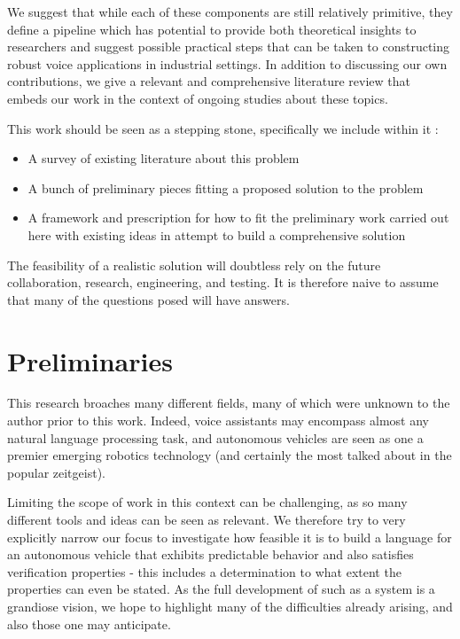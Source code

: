 \documentclass{article}
\begin{document}

We suggest that while each of these components are still relatively primitive,
they define a pipeline which has potential to provide both theoretical insights
to researchers and suggest possible practical steps that can be taken to
constructing robust voice applications in industrial settings. In addition to
discussing our own contributions, we give a relevant and comprehensive literature
review that embeds our work in the context of ongoing studies about these
topics.

This work should be seen as a stepping stone, specifically we include within it :

\begin{itemize}[noitemsep]
\item A survey of existing literature about this problem
\item A bunch of preliminary pieces fitting a proposed solution to the problem
\item A framework and prescription for how to fit the preliminary work carried
 out here with existing ideas in attempt to build a comprehensive solution
\end{itemize}

The feasibility of a realistic solution will doubtless rely on the future
collaboration, research, engineering, and testing. It is therefore naive to
assume that many of the questions posed will have answers.

\section{Preliminaries}

This research broaches many different fields, many of which were
unknown to the author prior to this work. Indeed, voice assistants may
encompass almost any natural language processing task, and autonomous vehicles are
seen as one a premier emerging robotics technology (and certainly the most talked
about in the popular zeitgeist).

Limiting the scope of work in this context can be challenging, as so many
different tools and ideas can be seen as relevant. We therefore try to very
explicitly narrow our focus to investigate how feasible it is to build a
language for an autonomous vehicle that exhibits predictable behavior and also
satisfies verification properties - this includes a determination to what extent
the properties can even be stated. As the full development of such as a system
is a grandiose vision, we hope to highlight many of the difficulties already
arising, and also those one may anticipate.
\end{document}
